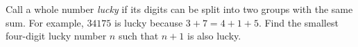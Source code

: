 Call a whole number \emph{lucky} if its digits can be split into two groups with the same sum. For example, $34175$ is lucky because $3+7=4+1+5$. Find the smallest four-digit lucky number $n$ such that $n+1$ is also lucky.
